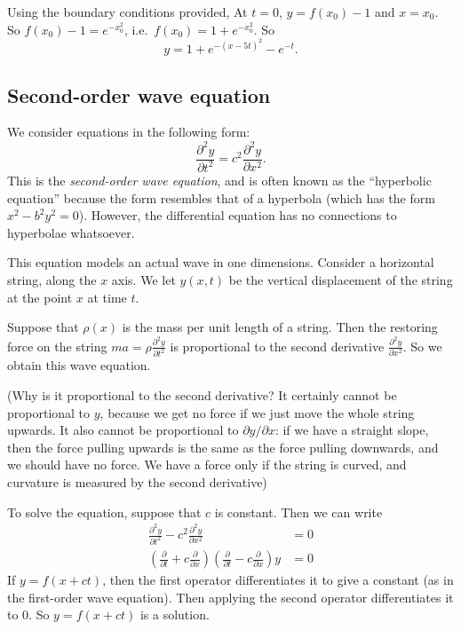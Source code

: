\documentclass[a4paper]{article}
\begin{document}
Using the boundary conditions provided, At $t = 0$, $y = f(x_0) - 1$ and $x = x_0$. So $f(x_0) - 1 = e^{-x_0^2}$, i.e.\ $f(x_0) = 1 + e^{-x_0^2}$. So
\[
  y = 1 + e^{-(x - 5t)^2} - e^{-t}.
\]
\subsection{Second-order wave equation}
We consider equations in the following form:
\[
  \frac{\partial ^2 y}{\partial t^2} = c^2 \frac{\partial^2 y}{\partial x^2}.
\]
This is the \emph{second-order wave equation}, and is often known as the ``hyperbolic equation'' because the form resembles that of a hyperbola (which has the form $x^2 - b^2 y^2 = 0$). However, the differential equation has no connections to hyperbolae whatsoever.

This equation models an actual wave in one dimensions. Consider a horizontal string, along the $x$ axis. We let $y(x, t)$ be the vertical displacement of the string at the point $x$ at time $t$.
\begin{center}
\end{center}
Suppose that $\rho(x)$ is the mass per unit length of a string. Then the restoring force on the string $\displaystyle ma = \rho \frac{\partial ^2 y}{\partial t^2}$ is proportional to the second derivative $\displaystyle\frac{\partial^2 y}{\partial x^2}$. So we obtain this wave equation.

(Why is it proportional to the second derivative? It certainly cannot be proportional to $y$, because we get no force if we just move the whole string upwards. It also cannot be proportional to $\partial y/\partial x$: if we have a straight slope, then the force pulling upwards is the same as the force pulling downwards, and we should have no force. We have a force only if the string is curved, and curvature is measured by the second derivative)

To solve the equation, suppose that $c$ is constant. Then we can write
\begin{align*}
  \frac{\partial ^2 y}{\partial t^2} - c^2 \frac{\partial^2 y}{\partial x^2} &= 0\\
  \left(\frac{\partial}{\partial t} + c\frac{\partial}{\partial x}\right)\left(\frac{\partial}{\partial t} - c\frac{\partial}{\partial x}\right) y &= 0
\end{align*}
If $y = f(x + ct)$, then the first operator differentiates it to give a constant (as in the first-order wave equation). Then applying the second operator differentiates it to $0$. So $y = f(x + ct)$ is a solution.
\end{document}
